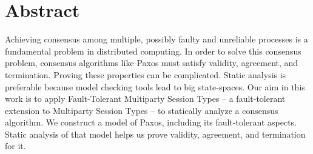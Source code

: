 \chapter*{Abstract}
Achieving consensus among multiple, possibly faulty and unreliable processes is a fundamental problem in distributed computing.
In order to solve this consensus problem, consensus algorithms like Paxos must satisfy validity, agreement, and termination.
Proving these properties can be complicated.
Static analysis is preferable because model checking tools lead to big state-spaces.
Our aim in this work is to apply Fault-Tolerant Multiparty Session Types -- a fault-tolerant extension to Multiparty Session Types -- to statically analyze a consensus algorithm.
We construct a model of Paxos, including its fault-tolerant aspects.
Static analysis of that model helps us prove validity, agreement, and termination for it.
